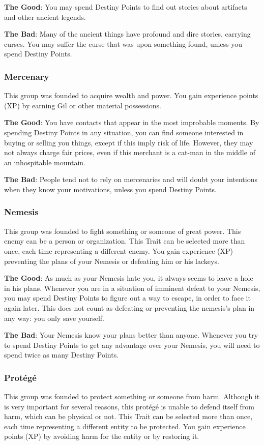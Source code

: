 \begin{multicols}{2}
\textbf{The Good}: You may spend Destiny Points
to find out stories about artifacts and other ancient
legends.

\textbf{The Bad}: Many of the ancient things have
profound and dire stories, carrying curses. You
may suffer the curse that was upon something
found, unless you spend Destiny Points.

\subsubsection{Mercenary}
This group was founded to acquire wealth
and power. You gain experience points (XP) by
earning Gil or other material possessions.

\textbf{The Good}: You have contacts that appear
in the most improbable moments. By spending
Destiny Points in any situation, you can find
someone interested in buying or selling you things,
except if this imply risk of life. However, they may
not always charge fair prices, even if this merchant
is a cat-man in the middle of an inhospitable
mountain.

\textbf{The Bad}: People tend not to rely on
mercenaries and will doubt your intentions when
they know your motivations, unless you spend
Destiny Points.

\subsubsection{Nemesis}
This group was founded to fight something
or someone of great power. This enemy can be a
person or organization. This Trait can be selected
more than once, each time representing a different
enemy. You gain experience (XP) preventing the
plans of your Nemesis or defeating him or his
lackeys.

\textbf{The Good}: As much as your Nemesis hate
you, it always seems to leave a hole in his plans.
Whenever you are in a situation of imminent
defeat to your Nemesis, you may spend Destiny
Points to figure out a way to escape, in order to face
it again later. This does not count as defeating or
preventing the nemesis’s plan in any way: you only
save yourself.

\textbf{The Bad}: Your Nemesis know your plans
better than anyone. Whenever you try to spend
Destiny Points to get any advantage over your
Nemesis, you will need to spend twice as many
Destiny Points.

\subsubsection{Protégé}
This group was founded to protect
something or someone from harm. Although it is
very important for several reasons, this protégé is
unable to defend itself from harm, which can be
physical or not. This Trait can be selected more
than once, each time representing a different
entity to be protected. You gain experience points
(XP) by avoiding harm for the entity or by
restoring it.


\end{multicols}
